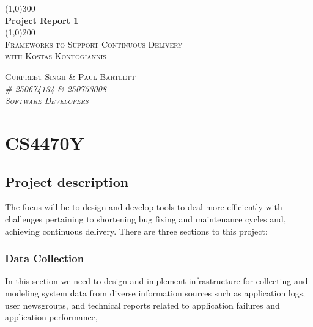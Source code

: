 \documentclass[11pt,]{article}
\begin{document}
\doublespacing

\begin{titlepage}
    \begin{center}
    \line(1,0){300} \\ 
    [0.25in]
    \huge{\bfseries Project Report 1} \\
    [2mm]
    \line(1,0){200} \\
    [1.5cm] 
    \textsc{\Large Frameworks to Support Continuous Delivery} \\
    [0.75cm]
    \textsc{\Large with Kostas Kontogiannis} \\
    [10cm]
    \end{center}
    
    \begin{flushright}
    \textsc{\Large{Gurpreet Singh \& Paul Bartlett \\} \normalsize\emph{\# 250674134 \& 250753008 \\} \normalsize\emph{Software Developers \\} }
    
    \end{flushright}
    
\end{titlepage}


\newpage

{
\hypersetup{linkcolor=black}
\setcounter{tocdepth}{2}
\tableofcontents
\newpage
}
\section{CS4470Y}\label{cs4470y}

\subsection{Project description}\label{project-description}

The focus will be to design and develop tools to deal more efficiently
with challenges pertaining to shortening bug fixing and maintenance
cycles and, achieving continuous delivery. There are three sections to
this project:

\subsubsection{Data Collection}\label{data-collection}

In this section we need to design and implement infrastructure for
collecting and modeling system data from diverse information sources
such as application logs, user newsgroups, and technical reports related
to application failures and application performance,
\end{document}
